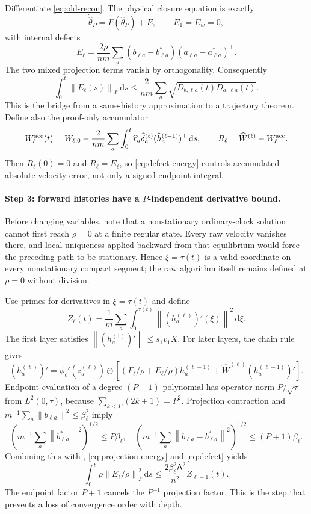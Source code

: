 \documentclass[11pt]{article}
\theoremstyle{definition}
\theoremstyle{remark}
\newcommand{\norm}[1]{\left\lVert #1\right\rVert}
\newcommand{\od}{\mathbin{\odot}}
\newcommand{\dd}{\,\mathrm{d}}
\begin{document}
Differentiate \eqref{eq:old-recon}.  The physical closure equation is exactly
\begin{equation}
 \dot{\widehat\theta}_P=F(\widehat\theta_P)+E,\qquad E_1=E_w=0,
\end{equation}
with internal defects
\begin{equation}
 E_\ell=\frac{2\rho}{nm}\sum_a
 (b_{\ell a}-b_{\ell a}^*)(a_{\ell a}-a_{\ell a}^*)^\top. \label{eq:defect}
\end{equation}
The two mixed projection terms vanish by orthogonality.  Consequently
\begin{equation}
 \int_0^t\norm{E_\ell(s)}_F\dd s
 \le\frac{2}{nm}\sum_a\sqrt{D_{b,\ell a}(t)D_{a,\ell a}(t)}. \label{eq:defect-energy}
\end{equation}
This is the bridge from a same-history approximation to a trajectory theorem.
Define also the proof-only accumulator
\[
 W_{\ell}^{\rm acc}(t)=W_{\ell,0}
 -\frac{2}{nm}\sum_a\int_0^t
 \widehat r_a\widehat\delta_a^{(\ell)}
 (\widehat h_a^{(\ell-1)})^\top\dd s,\qquad
 R_\ell=\widehat W^{(\ell)}-W_\ell^{\rm acc}.
\]
Then $R_\ell(0)=0$ and $\dot R_\ell=E_\ell$, so
\eqref{eq:defect-energy} controls accumulated absolute velocity error, not
only a signed endpoint integral.

\paragraph{Step 3: forward histories have a $P$-independent derivative
bound.}
Before changing variables, note that a nonstationary ordinary-clock solution
cannot first reach $\rho=0$ at a finite regular state.  Every raw velocity
vanishes there, and local uniqueness applied backward from that equilibrium
would force the preceding path to be stationary.  Hence $\xi=\tau(t)$ is a
valid coordinate on every nonstationary compact segment; the raw algorithm
itself remains defined at $\rho=0$ without division.

Use primes for derivatives in $\xi=\tau(t)$ and define
\[
 Z_\ell(t)=\frac1m\sum_a\int_0^{\tau(t)}
 \norm{(h_a^{(\ell)})'(\xi)}^2\dd\xi.
\]
The first layer satisfies
$\norm{(h_a^{(1)})'}\le s_1v_1X$.  For later layers, the chain rule gives
\[
 (h_a^{(\ell)})'=\phi_\ell'(z_a^{(\ell)})\od
 \left[(F_\ell/\rho+E_\ell/\rho)h_a^{(\ell-1)}
 +\widehat W^{(\ell)}(h_a^{(\ell-1)})'\right].       \label{eq:forward-chain}
\]
Endpoint evaluation of a degree-$(P-1)$ polynomial has operator norm
$P/\sqrt\tau$ from $L^2(0,\tau)$, because
$\sum_{k<P}(2k+1)=P^2$.  Projection contraction and
$m^{-1}\sum_a\norm{b_{\ell a}}^2\le\beta_\ell^2$ imply
\[
 \left(m^{-1}\sum_a\norm{b_{\ell a}^*}^2\right)^{1/2}\le P\beta_\ell,
 \quad
 \left(m^{-1}\sum_a\norm{b_{\ell a}-b_{\ell a}^*}^2\right)^{1/2}
 \le(P+1)\beta_\ell.
\]
Combining this with ,
\eqref{eq:projection-energy} and \eqref{eq:defect} yields
\begin{equation}
 \int_0^t\rho\norm{E_\ell/\rho}_F^2\dd s
 \le\frac{2\beta_\ell^2\mathsf A^2}{n^2}
 Z_{\ell-1}(t).                                      \label{eq:e-square}
\end{equation}
The endpoint factor $P+1$ cancels the $P^{-1}$ projection factor.  This is
the step that prevents a loss of convergence order with depth.
\end{document}
